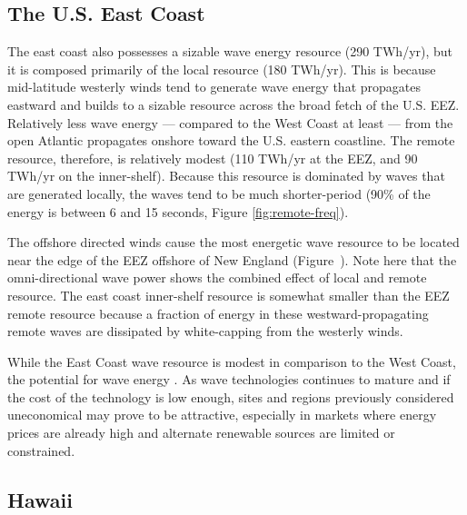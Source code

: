 \DIFdelend \subsection{The U.S. East Coast}

The east coast also possesses a sizable wave energy resource (290 TWh/yr), but it is composed primarily of the local resource (180 TWh/yr). This is because mid-latitude westerly winds tend to generate wave energy that propagates eastward and builds to a sizable resource across the broad fetch of the U.S. EEZ. Relatively less wave energy — compared to the West Coast at least — from the open Atlantic propagates onshore toward the U.S. eastern coastline\DIFdelbegin {}\DIFdelend . The remote resource, therefore, is relatively modest (110 TWh/yr at the EEZ, and 90 TWh/yr on the inner-shelf). Because this resource is dominated by waves that are generated locally, the waves tend to be much shorter-period (90\% of the energy is between 6 and 15 seconds, Figure \ref{fig:remote-freq}).

The offshore directed winds cause the most energetic wave resource to be located near the edge of the EEZ offshore of New England (Figure~\DIFdelbegin \DIFdel{\ref{fig:map-total}}\DIFdelend \DIFaddbegin \DIFadd{\ref{fig:maps}}\DIFaddend ). Note here that the omni-directional wave power shows the combined effect of local and remote resource. The east coast inner-shelf resource is somewhat smaller than the EEZ remote resource because a fraction of energy in these westward-propagating remote waves are dissipated by white-capping from the westerly winds.
\DIFdelbegin {}\DIFdelend 

While the East Coast wave resource is modest in comparison to the West Coast, \DIFaddbegin {}\DIFaddend the potential for wave energy \DIFdelbegin {}\DIFdelend \DIFaddbegin {}\DIFaddend . As wave technologies continues to mature and if the cost of the technology is low enough, sites and regions previously considered uneconomical may prove to be attractive, especially in markets where energy prices are already high and alternate renewable sources are limited or constrained. 

\subsection{Hawaii}

